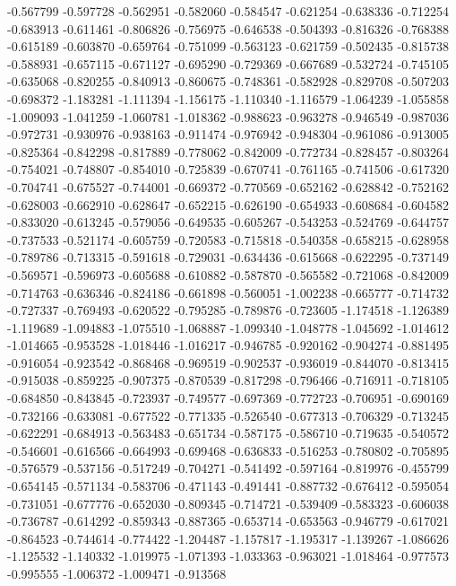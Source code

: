 -0.567799
-0.597728
-0.562951
-0.582060
-0.584547
-0.621254
-0.638336
-0.712254
-0.683913
-0.611461
-0.806826
-0.756975
-0.646538
-0.504393
-0.816326
-0.768388
-0.615189
-0.603870
-0.659764
-0.751099
-0.563123
-0.621759
-0.502435
-0.815738
-0.588931
-0.657115
-0.671127
-0.695290
-0.729369
-0.667689
-0.532724
-0.745105
-0.635068
-0.820255
-0.840913
-0.860675
-0.748361
-0.582928
-0.829708
-0.507203
-0.698372
-1.183281
-1.111394
-1.156175
-1.110340
-1.116579
-1.064239
-1.055858
-1.009093
-1.041259
-1.060781
-1.018362
-0.988623
-0.963278
-0.946549
-0.987036
-0.972731
-0.930976
-0.938163
-0.911474
-0.976942
-0.948304
-0.961086
-0.913005
-0.825364
-0.842298
-0.817889
-0.778062
-0.842009
-0.772734
-0.828457
-0.803264
-0.754021
-0.748807
-0.854010
-0.725839
-0.670741
-0.761165
-0.741506
-0.617320
-0.704741
-0.675527
-0.744001
-0.669372
-0.770569
-0.652162
-0.628842
-0.752162
-0.628003
-0.662910
-0.628647
-0.652215
-0.626190
-0.654933
-0.608684
-0.604582
-0.833020
-0.613245
-0.579056
-0.649535
-0.605267
-0.543253
-0.524769
-0.644757
-0.737533
-0.521174
-0.605759
-0.720583
-0.715818
-0.540358
-0.658215
-0.628958
-0.789786
-0.713315
-0.591618
-0.729031
-0.634436
-0.615668
-0.622295
-0.737149
-0.569571
-0.596973
-0.605688
-0.610882
-0.587870
-0.565582
-0.721068
-0.842009
-0.714763
-0.636346
-0.824186
-0.661898
-0.560051
-1.002238
-0.665777
-0.714732
-0.727337
-0.769493
-0.620522
-0.795285
-0.789876
-0.723605
-1.174518
-1.126389
-1.119689
-1.094883
-1.075510
-1.068887
-1.099340
-1.048778
-1.045692
-1.014612
-1.014665
-0.953528
-1.018446
-1.016217
-0.946785
-0.920162
-0.904274
-0.881495
-0.916054
-0.923542
-0.868468
-0.969519
-0.902537
-0.936019
-0.844070
-0.813415
-0.915038
-0.859225
-0.907375
-0.870539
-0.817298
-0.796466
-0.716911
-0.718105
-0.684850
-0.843845
-0.723937
-0.749577
-0.697369
-0.772723
-0.706951
-0.690169
-0.732166
-0.633081
-0.677522
-0.771335
-0.526540
-0.677313
-0.706329
-0.713245
-0.622291
-0.684913
-0.563483
-0.651734
-0.587175
-0.586710
-0.719635
-0.540572
-0.546601
-0.616566
-0.664993
-0.699468
-0.636833
-0.516253
-0.780802
-0.705895
-0.576579
-0.537156
-0.517249
-0.704271
-0.541492
-0.597164
-0.819976
-0.455799
-0.654145
-0.571134
-0.583706
-0.471143
-0.491441
-0.887732
-0.676412
-0.595054
-0.731051
-0.677776
-0.652030
-0.809345
-0.714721
-0.539409
-0.583323
-0.606038
-0.736787
-0.614292
-0.859343
-0.887365
-0.653714
-0.653563
-0.946779
-0.617021
-0.864523
-0.744614
-0.774422
-1.204487
-1.157817
-1.195317
-1.139267
-1.086626
-1.125532
-1.140332
-1.019975
-1.071393
-1.033363
-0.963021
-1.018464
-0.977573
-0.995555
-1.006372
-1.009471
-0.913568
